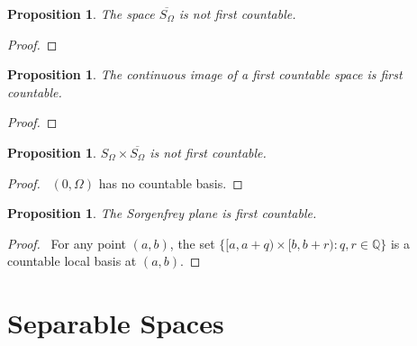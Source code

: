 \documentclass{report}
\let\qed\relax
\newtheorem{prop}[lm]{Proposition}
\theoremstyle{definition}
\begin{document}
    \begin{prop}
      \label{prop:topology:first_countable:S_omega}
    The space $\overline{S_\Omega}$ is not first countable.
  \end{prop}

  \begin{proof}
   \pf
   \qed
  \end{proof}

  \begin{prop}
   The continuous image of a first countable space is first countable.
  \end{prop}

  \begin{proof}
    \pf
    \qed
  \end{proof}

 \begin{prop}
   $S_\Omega \times \overline{S_\Omega}$ is not first countable.
 \end{prop}

 \begin{proof}
  \pf\ $(0, \Omega)$ has no countable basis. \qed
 \end{proof}

  \begin{prop}
  The Sorgenfrey plane is first countable.
 \end{prop}

 \begin{proof}
   \pf\ For any point $(a,b)$, the set $\{ [a, a + q) \times [b, b + r) : q, r
   \in \mathbb{Q} \}$ is a countable local basis at $(a,b)$. \qed
 \end{proof}


  \section{Separable Spaces}
\end{document}

